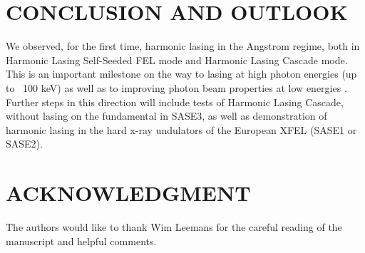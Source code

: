 \documentclass[aps,prl,preprint,groupedaddress,preprintnumbers]{revtex4}
\begin{document}
\section{CONCLUSION AND OUTLOOK}

We observed, for the first time, harmonic lasing in the Angstrom regime, both in 
Harmonic Lasing Self-Seeded FEL mode and Harmonic Lasing Cascade mode. This is an important milestone on the way 
to lasing at high photon energies (up to ~100 keV) \cite{100keV} as well as to improving photon beam properties at low energies \cite{hlss}. Further steps in this direction will include tests of Harmonic Lasing Cascade, without lasing on the fundamental in SASE3, as well as demonstration of harmonic lasing in the hard x-ray undulators of the European XFEL (SASE1 or SASE2).

\section{ACKNOWLEDGMENT}

The authors would like to thank Wim Leemans for the careful reading of the manuscript and helpful comments.
\end{document}
